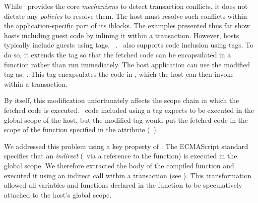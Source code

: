 While \txjs\ provides the core \textit{mechanisms} to detect transaction
conflicts, it does not dictate any \textit{policies} to resolve them. The
host must resolve such conflicts within the application-specific part of its
iblocks.
\label{section:implementation:auxiliary:script}
%
The examples presented thus far show hosts including guest code by inlining it
within a transaction.  However, hosts typically include guests using
 tags, \eg~.
\txjs\ also supports code inclusion using  tags. To do so, it
extends the  tag so that the fetched code can be encapsulated in a
function rather than run immediately. The host application can use the modified
 tag as: . This tag
encapsulates the code in , which the host can then invoke within a
transaction. 

By itself, this modification unfortunately affects the scope chain in which the
fetched code is executed.  \js\ code included using a  tag expects
to be executed in the global scope of the host, but the modified 
tag would put the fetched code in the scope of the function specified in the
 attribute (\eg~).

We addressed this problem using a key property of .  The ECMAScript
standard~\cite[Section 10.4.2]{ecma} specifies that an \textit{indirect}
 (\ie~via a reference to the  function) is executed in
the global scope. We therefore extracted the body of the compiled function
 and executed it using an indirect  call within a
transaction (see ). This transformation allowed all
variables and functions declared in the function  to be
speculatively attached to the host's global scope.
